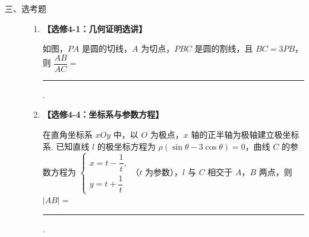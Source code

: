 \begin{description}

    \item[三、选考题]

    \begin{enumerate}[leftmargin=5pt]

      \addtocounter{enumi}{+14}

        \item \textbf{【选修4-1：几何证明选讲】}

如图，\(PA\) 是圆的切线，\(A\) 为切点，\(PBC\) 是圆的割线，且 \(BC=3PB\)，则 \(\dfrac{AB}{AC}=\)\rule[-0.3ex]{3em}{0.4pt}.

        \item \textbf{【选修4-4：坐标系与参数方程】}

在直角坐标系 \(xOy\) 中，以 \(O\) 为极点，\(x\) 轴的正半轴为极轴建立极坐标系. 已知直线 \(l\) 的极坐标方程为 \(\rho(\sin\theta-3\cos\theta)=0\)，曲线 \(C\) 的参数方程为 \(\begin{cases}
x=t-\dfrac1t,\\
y=t+\dfrac1t
\end{cases}\)（\(t\) 为参数），\(l\) 与 \(C\) 相交于 \(A\)，\(B\) 两点，则 \(|AB|=\)\rule[-0.3ex]{3em}{0.4pt}.

    \end{enumerate}

\end{description}

